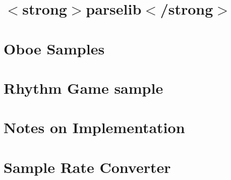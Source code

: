 \let\mypdfximage\pdfximage\def\pdfximage{\immediate\mypdfximage}\documentclass[twoside]{book}
\newcommand{\+}{\discretionary{\mbox{\scriptsize$\hookleftarrow$}}{}{}}
\begin{document}
\chapter{$<$strong$>$parselib$<$/strong$>$}
\label{md__c_1__users_fab_src__github_branches__neural_amp_modeler_plugin_i_plug2__dependencies__build_ee06ad8d4bc509959e55bd63ff2da8ea}

\chapter{Oboe Samples}
\label{md__c_1__users_fab_src__github_branches__neural_amp_modeler_plugin_i_plug2__dependencies__build_0adb41cf97236637db53dc8775e34c8a}

\chapter{Rhythm Game sample}
\label{md__c_1__users_fab_src__github_branches__neural_amp_modeler_plugin_i_plug2__dependencies__build_5854df48a96ffa246fbc6152e12a7233}

\chapter{Notes on Implementation}
\label{md__c_1__users_fab_src__github_branches__neural_amp_modeler_plugin_i_plug2__dependencies__build_5ab05608e705b1aba3c711003887b790}

\chapter{Sample Rate Converter}
\label{md__c_1__users_fab_src__github_branches__neural_amp_modeler_plugin_i_plug2__dependencies__build_170706edb48ec08fcbe305f48f6c2f64}

\end{document}
